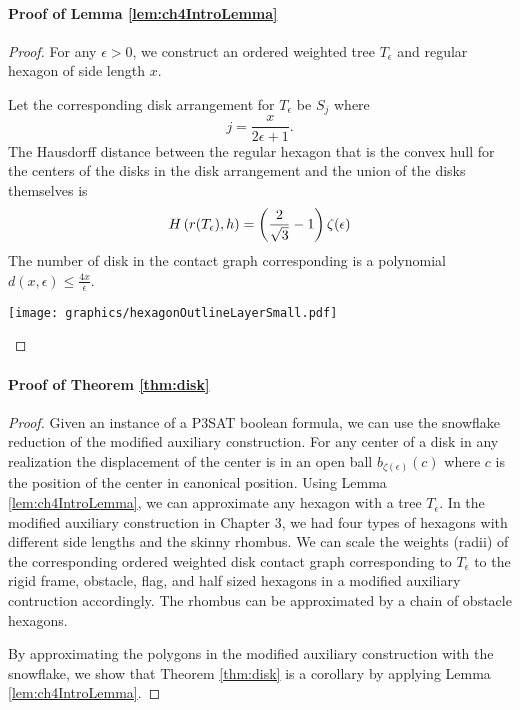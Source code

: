 \paragraph{Proof of Lemma \ref{lem:ch4IntroLemma}}
\begin{proof}
For any $\epsilon>0$, we construct an ordered weighted tree $T_\epsilon$ and regular hexagon of side length $x$. 
 
Let the corresponding disk arrangement for $T_\epsilon$ be $S_j$ where $$j=\frac{x}{2 \epsilon + 1}.$$  
The Hausdorff distance between the regular hexagon that is the convex hull for the centers of the disks in the disk arrangement and the union of the disks themselves is $$H\left( r(T_\epsilon),h \right) = \left( \frac{2}{\sqrt{3}} - 1 \right) \zeta(\epsilon)$$
The number of disk in the contact graph corresponding is a polynomial $d(x,\epsilon) \leq \frac{4x}{\epsilon}$.  

\begin{minipage}{\linewidth}
\begin{center}
\texttt{[image: graphics/hexagonOutlineLayerSmall.pdf]}
\label{fig:hexagonOutlineLayerSmall.pdf}
\end{center}
\end{minipage}
\end{proof}

\paragraph{Proof of Theorem \ref{thm:disk}}

\begin{proof}
Given an instance of a P3SAT boolean formula, we can use the snowflake reduction of the modified auxiliary construction.  
For any center of a disk in any realization the displacement of the center is in an open ball $b_{\zeta(\epsilon)}(c)$ where $c$ is the position of the center in canonical position.  
Using Lemma \ref{lem:ch4IntroLemma}, we can approximate any hexagon with a tree $T_\epsilon$.  
In the modified auxiliary construction in Chapter 3, we had four types of hexagons with different side lengths and the skinny rhombus.  
We can scale the weights (radii) of the corresponding ordered weighted disk contact graph corresponding to $T_\epsilon$ to the rigid frame, obstacle, flag, and half sized hexagons in a modified auxiliary contruction accordingly.  
The rhombus can be approximated by a chain of obstacle hexagons.

By approximating the polygons in the modified auxiliary construction with the snowflake, we show that Theorem \ref{thm:disk} is a corollary by applying Lemma \ref{lem:ch4IntroLemma}.  
\end{proof}
